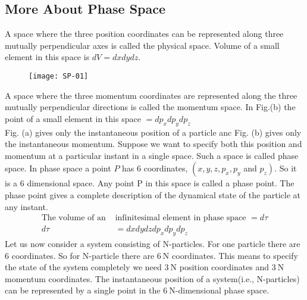 \subsection{More About Phase Space}
 A space where the three position coordinates can be represented along three mutually perpendicular axes is called the physical space. Volume of a small element in this space is $d V=d x d y d z$.
\begin{figure}[H]
	\centering
	\texttt{[image: SP-01]}
\end{figure}
\par A space where the three momentum coordinates are represented along the three mutually perpendicular directions is called the momentum space. In Fig.(b) the point of a small element in this space $=d p_{x} d p_{y} d p_{z}$\\
 Fig. (a) gives only the instantaneous position of a particle anc Fig. (b) gives only the instantaneous momentum. Suppose we want to specify both this position and momentum at a particular instant in a single space. Such a space is called phase space. In phase space a point $P$ has 6 coordinates, $\left(x, y, z, p_{x}, p_{y}\right.$ and $\left.p_{z}\right)$. So it is a 6 dimensional space. Any point $\mathrm{P}$ in this space is called a phase point. The phase point gives a complete description of the dynamical state of the particle at any instant.
 \begin{align*}
 \text{The volume of an }&\text{infinitesimal element in phase space $=d \tau$}\\
 d \tau&=d x d y d z d p_{x} d p_{y} d p_{z}
 \end{align*}
Let us now consider a system consisting of N-particles. For one particle there are 6 coordinates. So for N-particle there are $6 \mathrm{~N}$ coordinates. This means to specify the state of the system completely we need $3 \mathrm{~N}$ position coordinates and $3 \mathrm{~N}$ momentum coordinates. The instantaneous position of a system(i.e., N-particles) can be represented by a single point in the $6 \mathrm{~N}$-dimensional phase space.

